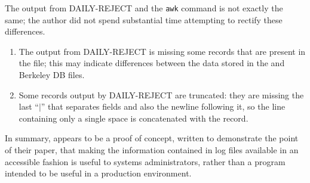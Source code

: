 The output from DAILY-REJECT and the \texttt{awk} command is not exactly
the same; the author did not spend substantial time attempting to rectify
these differences.

\begin{enumerate}

    \item The output from DAILY-REJECT is missing some records that are
        present in the  file; this may indicate differences
        between the data stored in the  and Berkeley DB files.

    \item Some records output by DAILY-REJECT are truncated: they are
        missing the last ``$|$'' that separates fields and also the newline
        following it, so the line containing only a single space is
        concatenated with the record.

\end{enumerate}

In summary,  appears to be a proof of concept, written to
demonstrate the point of their paper, that making the information contained
in log files available in an accessible fashion is useful to systems
administrators, rather than a program intended to be useful in a production
environment.

%

